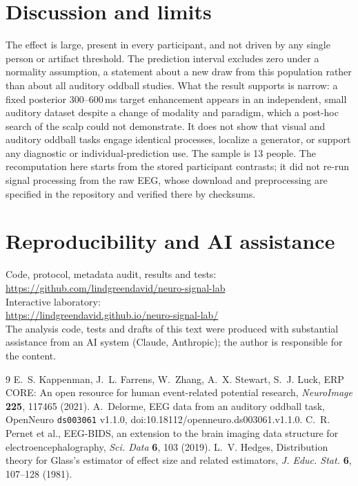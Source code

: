 \documentclass[11pt]{article}
\begin{document}
\section{Discussion and limits}
The effect is large, present in every participant, and not driven by any single person or artifact threshold. The prediction interval
excludes zero under a normality assumption, a statement about a new draw from this population rather than about all auditory
oddball studies. What the result supports is narrow: a fixed posterior 300--600\,ms target enhancement appears in an independent,
small auditory dataset despite a change of modality and paradigm, which a post-hoc search of the scalp could not demonstrate. It does
not show that visual and auditory oddball tasks engage identical processes, localize a generator, or support any diagnostic or
individual-prediction use. The sample is 13 people. The recomputation here starts from the stored participant contrasts; it did not
re-run signal processing from the raw EEG, whose download and preprocessing are specified in the repository and verified there
by checksums.

\section*{Reproducibility and AI assistance}
Code, protocol, metadata audit, results and tests:\\
\url{https://github.com/lindgreendavid/neuro-signal-lab}\\
Interactive laboratory:\\
\url{https://lindgreendavid.github.io/neuro-signal-lab/}\\
The analysis code, tests and drafts of this text were produced with substantial assistance from an AI system (Claude, Anthropic);
the author is responsible for the content.

\begin{thebibliography}{9}
 E.~S. Kappenman, J.~L. Farrens, W.~Zhang, A.~X. Stewart, S.~J. Luck, ERP CORE: An open resource for
human event-related potential research, \emph{NeuroImage} \textbf{225}, 117465 (2021).
 A.~Delorme, EEG data from an auditory oddball task, OpenNeuro \texttt{ds003061} v1.1.0,
doi:10.18112/openneuro.ds003061.v1.1.0.
 C.~R. Pernet et al., EEG-BIDS, an extension to the brain imaging data structure for electroencephalography,
\emph{Sci. Data} \textbf{6}, 103 (2019).
 L.~V. Hedges, Distribution theory for Glass's estimator of effect size and related estimators,
\emph{J. Educ. Stat.} \textbf{6}, 107--128 (1981).
\end{thebibliography}
\end{document}
